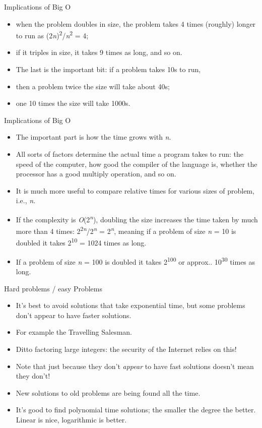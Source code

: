 \documentclass{beamer}
\begin{document}
\begin{frame}
Implications of Big O

\begin{itemize}
\item when the problem doubles in size, the problem takes 4 times (roughly) longer to run as
(2\textit{n})\textsuperscript{2}/\textit{n}\textsuperscript{2 }= 4; 
\item if it triples in size, it takes 9 times as long, and so on.
\item The last is the important bit: if a problem takes 10s to run, 
\item then a problem twice the size will take about 40s; 
\item one 10 times the size will take 1000s.
\end{itemize}
\end{frame} \begin{frame}

Implications of Big O

\begin{itemize}
\item The important part is how the time grows with \textit{n}.
\item All sorts of factors determine the actual time a program takes to run: the speed of the computer, how good the
compiler of the language is, whether the processor has a good multiply operation, and so on.
\item It is much more useful to compare relative times for various sizes of problem, i.e., \textit{n}.
\item If the complexity is \textit{O}(2\textit{\textsuperscript{n}}), doubling the size increases the time taken by much
more than 4 times: 2\textsuperscript{2}\textit{\textsuperscript{n}}/2\textit{\textsuperscript{n }}=
2\textit{\textsuperscript{n}}, meaning if a problem of size \textit{n }= 10 is doubled it takes 2\textsuperscript{10 }=
1024 times as long.
\item If a problem of size \textit{n }= 100 is doubled it takes 2\textsuperscript{100 }or approx.. 10\textsuperscript{30
}times as long.
\end{itemize}
\end{frame} \begin{frame}

Hard problems / easy Problems
\begin{itemize}
\item It's best to avoid solutions that take exponential time, but some problems don't appear to have faster solutions.
\item For example the Travelling Salesman.
\item Ditto factoring large integers: the security of the Internet relies on this!
\item Note that just because they don't \textit{appear }to have fast solutions doesn't mean they don't!
\item New solutions to old problems are being found all the time.
\item It's good to find polynomial time solutions; the smaller the degree the better. Linear is nice, logarithmic is
better.
\end{itemize}
\end{frame} 
\end{document}
